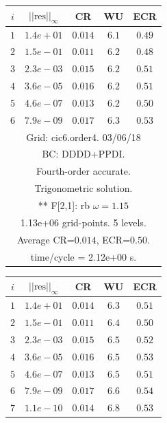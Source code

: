 \begin{table}[hbt]
\begin{center}
{\tablefontsize
\begin{tabular}{|c|c|c|c|c|} \hline 
 $i$   & $\vert\vert\mbox{res}\vert\vert_\infty$  &  CR     &  WU    & ECR  \\   \hline 
 $ 1$  & $ 1.4e+01$ & $0.014$ & $ 6.1$ & $0.49$ \\ 
 $ 2$  & $ 1.5e-01$ & $0.011$ & $ 6.2$ & $0.48$ \\ 
 $ 3$  & $ 2.3e-03$ & $0.015$ & $ 6.2$ & $0.51$ \\ 
 $ 4$  & $ 3.6e-05$ & $0.016$ & $ 6.2$ & $0.51$ \\ 
 $ 5$  & $ 4.6e-07$ & $0.013$ & $ 6.2$ & $0.50$ \\ 
 $ 6$  & $ 7.9e-09$ & $0.017$ & $ 6.3$ & $0.53$ \\ 
\hline 
\multicolumn{5}{|c|}{Grid: cic6.order4. 03/06/18}  \\
\multicolumn{5}{|c|}{BC: DDDD+PPDI.}  \\
\multicolumn{5}{|c|}{Fourth-order accurate.}  \\
\multicolumn{5}{|c|}{Trigonometric solution.}  \\
\multicolumn{5}{|c|}{** F[2,1]: rb $\omega=1.15$}  \\
\multicolumn{5}{|c|}{1.13e+06 grid-points. 5 levels.}  \\
\multicolumn{5}{|c|}{Average CR=$0.014$, ECR=$0.50$.}  \\
\multicolumn{5}{|c|}{time/cycle = 2.12e+00 s.}  \\
\hline 
\end{tabular}
\begin{tabular}{|c|c|c|c|c|} \hline 
 $i$   & $\vert\vert\mbox{res}\vert\vert_\infty$  &  CR     &  WU    & ECR  \\   \hline 
 $ 1$  & $ 1.4e+01$ & $0.014$ & $ 6.3$ & $0.51$ \\ 
 $ 2$  & $ 1.5e-01$ & $0.011$ & $ 6.4$ & $0.50$ \\ 
 $ 3$  & $ 2.3e-03$ & $0.015$ & $ 6.5$ & $0.52$ \\ 
 $ 4$  & $ 3.6e-05$ & $0.016$ & $ 6.5$ & $0.53$ \\ 
 $ 5$  & $ 4.6e-07$ & $0.013$ & $ 6.5$ & $0.51$ \\ 
 $ 6$  & $ 7.9e-09$ & $0.017$ & $ 6.6$ & $0.54$ \\ 
 $ 7$  & $ 1.1e-10$ & $0.014$ & $ 6.8$ & $0.53$ \\ 

\end{tabular}}
\end{center}
\end{table}
